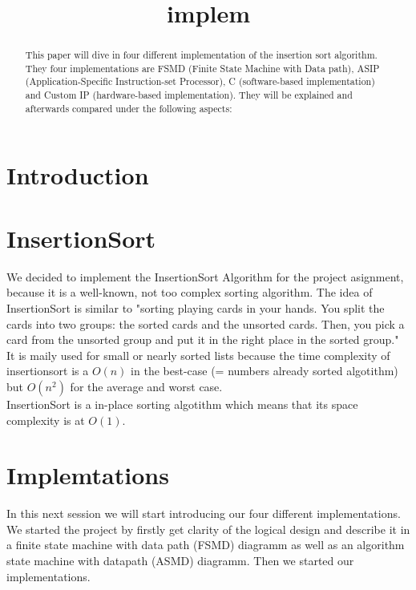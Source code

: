 \documentclass[conference]{IEEEtran}
\begin{document}
\title{implem \\}

\maketitle

\begin{abstract}
This paper will dive in four different implementation of the insertion sort algorithm. They four implementations are FSMD (Finite State Machine with Data path), ASIP (Application-Specific Instruction-set Processor), C (software-based implementation) and Custom IP (hardware-based implementation). They will be explained and afterwards compared under the following aspects:
\end{abstract}

\section{Introduction}

\section{InsertionSort}
We decided to implement the InsertionSort Algorithm for the project asignment, because it is a well-known, not too complex sorting algorithm. The idea of InsertionSort is similar to "sorting playing cards in your hands. You split the cards into two groups: the sorted cards and the unsorted cards. Then, you pick a card from the unsorted group and put it in the right place in the sorted group." \cite{g4g}\\
It is maily used for small or nearly sorted lists because the time complexity of insertionsort is a $O(n)$ in the best-case (= numbers already sorted algotithm) but $O(n^2)$ for the average and worst case. \\
InsertionSort is a in-place sorting algotithm which means that its space complexity is at $O(1)$. 


\section{Implemtations}
In this next session we will start introducing our four different implementations. We started the project by firstly get clarity of the logical design and describe it in a finite state machine with data path (FSMD) diagramm as well as an algorithm state machine with datapath (ASMD) diagramm. Then we started our implementations.
\end{document}

